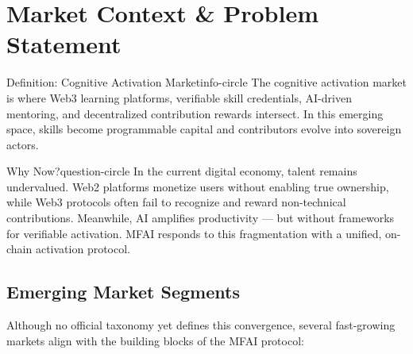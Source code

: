 \section{Market Context \& Problem Statement}

\begin{mfai-box}{Definition: Cognitive Activation Market}{info-circle}
The cognitive activation market is where Web3 learning platforms, verifiable skill credentials, AI-driven mentoring, and decentralized contribution rewards intersect. In this emerging space, skills become programmable capital and contributors evolve into sovereign actors.
\end{mfai-box}

\vspace{1em}

\begin{mfai-box}{Why Now?}{question-circle}
In the current digital economy, talent remains undervalued. Web2 platforms monetize users without enabling true ownership, while Web3 protocols often fail to recognize and reward non-technical contributions. Meanwhile, AI amplifies productivity — but without frameworks for verifiable activation. MFAI responds to this fragmentation with a unified, on-chain activation protocol.
\end{mfai-box}

\vspace{1.5em}

\subsection*{Emerging Market Segments}

Although no official taxonomy yet defines this convergence, several fast-growing markets align with the building blocks of the MFAI protocol:

\begin{center}
\end{center}

